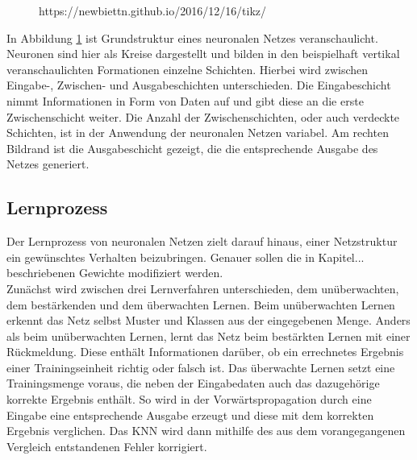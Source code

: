 \begin{figure}[H]
				\caption{https://newbiettn.github.io/2016/12/16/tikz/}
				\label{fig: neuronales netz }
		\end{figure}
	
		
		In Abbildung \ref{fig: neuronales netz } ist Grundstruktur eines neuronalen Netzes veranschaulicht. Neuronen sind hier als Kreise dargestellt und bilden in den beispielhaft vertikal veranschaulichten Formationen einzelne Schichten. Hierbei wird zwischen Eingabe-, Zwischen- und Ausgabeschichten unterschieden. Die Eingabeschicht nimmt Informationen in Form von Daten auf und gibt diese an die erste Zwischenschicht weiter. Die Anzahl der Zwischenschichten, oder auch verdeckte Schichten, ist in der Anwendung der neuronalen Netzen variabel. Am rechten Bildrand ist die Ausgabeschicht gezeigt, die die entsprechende Ausgabe des Netzes generiert.  
	
		\subsection{Lernprozess}
		Der Lernprozess von neuronalen Netzen zielt darauf hinaus, einer Netzstruktur ein gewünschtes Verhalten beizubringen. Genauer sollen die in Kapitel... beschriebenen Gewichte modifiziert werden.\\
		
		Zunächst wird zwischen drei Lernverfahren unterschieden, dem unüberwachten, dem bestärkenden und dem überwachten Lernen. Beim unüberwachten Lernen erkennt das Netz selbst Muster und Klassen aus der eingegebenen Menge. Anders als beim unüberwachten Lernen, lernt das Netz beim bestärkten Lernen mit einer Rückmeldung. Diese enthält Informationen darüber, ob ein errechnetes Ergebnis einer Trainingseinheit richtig oder falsch ist. Das überwachte Lernen setzt eine Trainingsmenge voraus, die neben der Eingabedaten auch das dazugehörige korrekte Ergebnis enthält. So wird in der Vorwärtspropagation durch eine Eingabe eine entsprechende Ausgabe erzeugt und diese mit dem korrekten Ergebnis verglichen. Das KNN wird dann mithilfe des aus dem vorangegangenen Vergleich entstandenen Fehler korrigiert.\cite{Kriesel}\\
		
